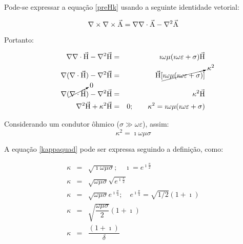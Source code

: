         Pode-se expressar a equação \ref{preHk} usando a seguinte identidade vetorial:
        
        \begin{equation}
            \nabla \times \nabla \times \vec{\textrm{A}} = \nabla \nabla \cdot \vec{\textrm{A}} - \nabla^2 \vec{\textrm{A}} 
        \end{equation}

        \noindent Portanto:
        
        {\setlength\arraycolsep{2pt}
        \begin{eqnarray}
            \label{difH}
            \nabla \nabla \cdot \vec{\textrm{H}} - \nabla^2 \vec{\textrm{H}} & = & \imath \omega \mu (\imath \omega \varepsilon + \sigma) \vec{\textrm{H}} \nonumber \\
            \nabla (\nabla \cdot \vec{\textrm{H}}) - \nabla^2 \vec{\textrm{H}} & = & \vec{\textrm{H}}[\cancelto{\kappa^2}{\imath \omega \mu (\imath \omega \varepsilon + \sigma)}] \nonumber \\
            \nabla (\cancelto{0}{\nabla \cdot \vec{\textrm{H}}}) - \nabla^2 \vec{\textrm{H}} & = & \kappa^2 \vec{\textrm{H}} \nonumber \\
            \nabla^2 \vec{\textrm{H}} + \kappa^2 \vec{\textrm{H}} & = &  0; \qquad \kappa^2 = \imath \omega \mu (\imath \omega \varepsilon + \sigma)
        \end{eqnarray}}        
        
        Considerando um condutor ôhmico ($\sigma \gg \omega \varepsilon$), assim:
        \begin{equation}
            \label{kappaquad}
            \kappa^2 = \imath \omega \mu \sigma
        \end{equation}
        
        A equação \ref{kappaquad} pode ser expressa seguindo a definição, como:
        
        {\setlength\arraycolsep{2pt}
        \begin{eqnarray}
            \kappa & = & \sqrt{\imath \omega \mu \sigma}; \quad \imath = e^{\imath \frac{\pi}{2}} \nonumber \\
            \kappa & = & \sqrt{\omega \mu \sigma} \sqrt{e^{\imath \frac{\pi}{2}}} \nonumber \\
            \kappa & = & \sqrt{\omega \mu \sigma} e^{\imath \frac{\pi}{4}}; \quad e^{\imath \frac{\pi}{4}} = \sqrt{1/2} (1 + \imath) \nonumber \\
            \kappa & = & \sqrt{\dfrac{\omega \mu \sigma}{2}} (1 + \imath) \nonumber \\
            \kappa & = & \dfrac{(1 + \imath)}{\delta}
        \end{eqnarray}} 
        
